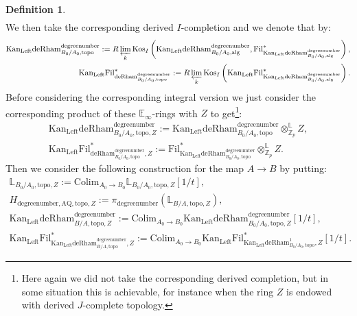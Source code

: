 \documentclass[11pt]{book}
\theoremstyle{definition}
\newtheorem{definition}[theorem]{Definition}
\numberwithin{equation}{section}
\begin{document}
\begin{definition}
\begin{align}
\end{align}
We then take the corresponding derived $I$-completion and we denote that by:
\begin{align}
\mathrm{Kan}_\mathrm{Left}\mathrm{deRham}^\text{degreenumber}_{B_0/A_0,\mathrm{topo}}:=R\varprojlim_k\mathrm{Kos}_I\left(\mathrm{Kan}_\mathrm{Left}\mathrm{deRham}^\text{degreenumber}_{B_0/A_0,\mathrm{alg}},\mathrm{Fil}^*_{\mathrm{Kan}_\mathrm{Left}\mathrm{deRham}^\text{degreenumber}_{B_0/A_0,\mathrm{alg}}}\right),\\
\mathrm{Kan}_\mathrm{Left}\mathrm{Fil}^*_{\mathrm{deRham}^\text{degreenumber}_{B_0/A_0,\mathrm{topo}}}:=R\varprojlim_k\mathrm{Kos}_I\left(\mathrm{Kan}_\mathrm{Left}\mathrm{Fil}^*_{\mathrm{Kan}_\mathrm{Left}\mathrm{deRham}^\text{degreenumber}_{B_0/A_0,\mathrm{alg}}}\right).	
\end{align}
Before considering the corresponding integral version we just consider the corresponding product of these $\mathbb{E}_\infty$-rings with $Z$ to get\footnote{Here again we did not take the corresponding derived completion, but in some situation this is achievable, for instance when the ring $Z$ is endowed with derived $J$-complete topology.}:
\begin{align}
\mathrm{Kan}_\mathrm{Left}\mathrm{deRham}^\text{degreenumber}_{B_0/A_0,\mathrm{topo},Z}:=\mathrm{Kan}_\mathrm{Left}\mathrm{deRham}^\text{degreenumber}_{B_0/A_0,\mathrm{topo}}{\otimes}^\mathbb{L}_{\mathbb{Z}_p}Z,\\
\mathrm{Kan}_\mathrm{Left}\mathrm{Fil}^*_{\mathrm{deRham}^\text{degreenumber}_{B_0/A_0,\mathrm{topo}},Z}:=\mathrm{Fil}^*_{\mathrm{Kan}_\mathrm{Left}\mathrm{deRham}^\text{degreenumber}_{B_0/A_0,\mathrm{topo}}}{\otimes}^\mathbb{L}_{\mathbb{Z}_p}Z.	
\end{align}
Then we consider the following construction for the map $A\rightarrow B$ by putting:
\begin{align}
\mathbb{L}_{B_0/A_0,\mathrm{topo},Z}:= \mathrm{Colim}_{A_0\rightarrow B_0}\mathbb{L}_{B_0/A_0,\mathrm{topo},Z}[1/t],\\
H_{\text{degreenumber},{\mathrm{AQ}},\mathrm{topo},Z}:=\pi_\text{degreenumber} (\mathbb{L}_{B/A,\mathrm{topo},Z}),	\\
\mathrm{Kan}_\mathrm{Left}\mathrm{deRham}^\text{degreenumber}_{B/A,\mathrm{topo},Z}:=\mathrm{Colim}_{A_0\rightarrow B_0}\mathrm{Kan}_\mathrm{Left}\mathrm{deRham}^\text{degreenumber}_{B_0/A_0,\mathrm{topo},Z}[1/t],\\
\mathrm{Kan}_\mathrm{Left}\mathrm{Fil}^*_{\mathrm{Kan}_\mathrm{Left}\mathrm{deRham}^\text{degreenumber}_{B/A,\mathrm{topo}},Z}:=\mathrm{Colim}_{A_0\rightarrow B_0}\mathrm{Kan}_\mathrm{Left}\mathrm{Fil}^*_{\mathrm{Kan}_\mathrm{Left}\mathrm{deRham}^1_{B_0/A_0,\mathrm{topo}},Z}[1/t].

\end{align}
\end{definition}
\end{document}
